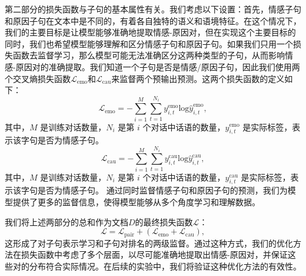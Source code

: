 第二部分的损失函数与子句的基本属性有关。我们考虑以下设置：首先，情感子句和原因子句在文本中是不同的，有着各自独特的语义和语境特征。在这个情况下，我们的主要目标是让模型能够准确地提取情感-原因对，但在实现这个主要目标的同时，我们也希望模型能够理解和区分情感子句和原因子句。如果我们只用一个损失函数去监督学习，那么模型可能无法准确区分这两种类型的子句，从而影响情感-原因对的准确提取。我们知道一个子句是否是情感/原因子句，因此我们使用两个交叉熵损失函数$\mathcal{L}_{\text{emo}}$和$\mathcal{L}_{\text{cau}}$来监督两个预输出预测。这两个损失函数的定义如下：
\vspace{3pt}  \begin{equation}
\mathcal{L}_{\text{emo}} = -\sum_{i=1}^{M}\sum_{t=1}^{N_i} y^{\text{emo}}_{i,t}  \text{log} \hat{y}^{\text{emo}}_{i,t},
\end{equation} \vspace{4pt}
其中，$M$ 是训练对话数量，$N_i$ 是第 $i$ 个对话中话语的数量，$y^{\text{emo}}_{i,t}$ 是实际标签，表示该字句是否为情感子句。  
\vspace{3pt}  \begin{equation}
\mathcal{L}_{\text{cau}} = -\sum_{i=1}^{M}\sum_{t=1}^{N_i} y^{\text{cau}}_{i,t}  \text{log} \hat{y}^{\text{cau}}_{i,t},
\end{equation} \vspace{4pt}
其中，$M$ 是训练对话数量，$N_i$ 是第 $i$ 个对话中话语的数量，$y^{\text{cau}}_{i,t}$ 是实际标签，表示该字句是否为情感子句。  
通过同时监督情感子句和原因子句的预测，我们为模型提供了更多的监督信息，使得模型能够从多个角度学习和理解数据。 


我们将上述两部分的总和作为文档$D$的最终损失函数$\mathcal{L}$：
\vspace{3pt}  \begin{equation}
    \mathcal{L} = \mathcal{L}_{\text{pair}} + (\mathcal{L}_{\text{emo}} + \mathcal{L}_{\text{cau}}),
\end{equation} \vspace{4pt}
这形成了对子句表示学习和子句对排名的两级监督。通过这种方式，我们的优化方法在损失函数中考虑了多个层面，以尽可能准确地提取出情感-原因对，并保证这些对的分布符合实际情况。在后续的实验中，我们将验证这种优化方法的有效性。



